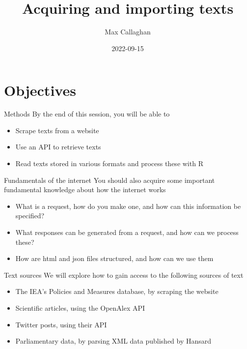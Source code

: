 \documentclass[
  10pt,
  ignorenonframetext,
  aspectratio=169]{beamer}
\title{Acquiring and importing texts}
\author{Max Callaghan}
\date{2022-09-15}
\begin{document}
\frame{\titlepage}

\hypertarget{objectives}{%
\section{Objectives}\label{objectives}}

\begin{frame}{Methods}
\protect\hypertarget{methods}{}
By the end of this session, you will be able to

\begin{itemize}
  \item<1-> Scrape texts from a website
  \item<2-> Use an API to retrieve texts
  \item<3-> Read texts stored in various formats and process these with R
\end{itemize}
\end{frame}

\begin{frame}{Fundamentals of the internet}
\protect\hypertarget{fundamentals-of-the-internet}{}
You should also acquire some important fundamental knowledge about how
the internet works

\begin{itemize}
  \item<1-> What is a request, how do you make one, and how can this information be specified?
  \item<2-> What responses can be generated from a request, and how can we process these?
  \item<3-> How are html and json files structured, and how can we use them
\end{itemize}
\end{frame}

\begin{frame}{Text sources}
\protect\hypertarget{text-sources}{}
We will explore how to gain access to the following sources of text

\begin{itemize}
  \item<1-> The IEA's Policies and Measures database, by scraping the website
  \item<2-> Scientific articles, using the OpenAlex API
  \item<2-> Twitter posts, using their API
  \item<3-> Parliamentary data, by parsing XML data published by Hansard
\end{itemize}
\end{frame}
\end{document}
